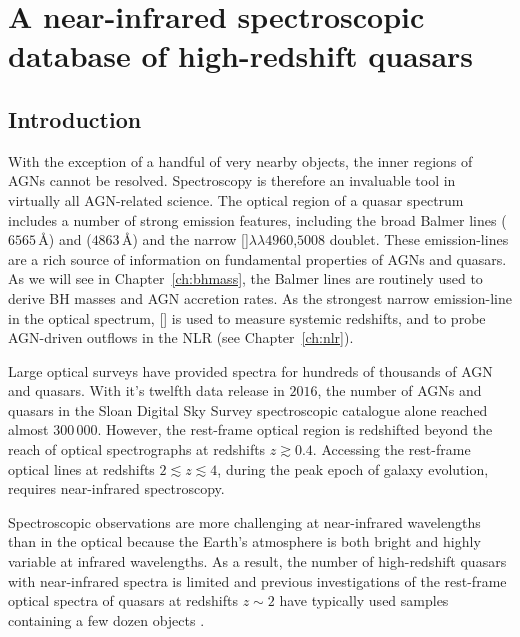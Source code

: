 
\chapter{A near-infrared spectroscopic database of high-redshift quasars}
\label{ch:nirsample}

\section{Introduction}

With the exception of a handful of very nearby objects, the inner regions of AGNs cannot be resolved. 
Spectroscopy is therefore an invaluable tool in virtually all AGN-related science. 
The optical region of a quasar spectrum includes a number of strong emission features, including the broad Balmer lines \ha ($6565$\,\AA) and \hb ($4863$\,\AA) and the narrow []$\lambda\lambda$$4960$,$5008$ doublet.
These emission-lines are a rich source of information on fundamental properties of AGNs and quasars.  
As we will see in Chapter~\ref{ch:bhmass}, the Balmer lines are routinely used to derive BH masses and AGN accretion rates. 
As the strongest narrow emission-line in the optical spectrum, [] is used to measure systemic redshifts, and to probe AGN-driven outflows in the NLR (see Chapter~\ref{ch:nlr}). 

Large optical surveys have provided spectra for hundreds of thousands of AGN and quasars. 
With it's twelfth data release in $2016$, the number of AGNs and quasars in the Sloan Digital Sky Survey \citep[SDSS;][]{york00} spectroscopic catalogue alone reached almost $300\,000$. 
However, the rest-frame optical region is redshifted beyond the reach of optical spectrographs at redshifts $z \gtrsim0.4$. 
Accessing the rest-frame optical lines at redshifts $2 \lesssim z \lesssim 4$, during the peak epoch of galaxy evolution, requires near-infrared spectroscopy.  

Spectroscopic observations are more challenging at near-infrared wavelengths than in the optical because the Earth's atmosphere is both bright and highly variable at infrared wavelengths. 
As a result, the number of high-redshift quasars with near-infrared spectra is limited and previous investigations of the rest-frame optical spectra of quasars at redshifts $z\sim2$ have typically used samples containing a few dozen objects \citep[e.g.][]{marziani09,shen12,shen16a}. 

